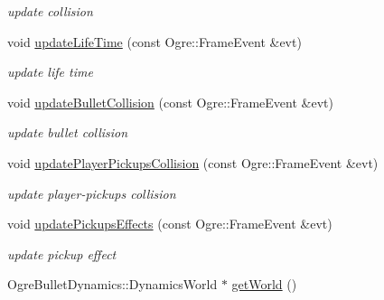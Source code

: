 \begin{DoxyCompactItemize}
\begin{DoxyCompactList}\small\item\em update collision \end{DoxyCompactList}\item 
void \hyperlink{class_n_c_t_u_1_1_obstacle_manager_a879d568c6f03ca00924e6bca87de1b4e}{update\+Life\+Time} (const Ogre\+::\+Frame\+Event \&evt)\hypertarget{class_n_c_t_u_1_1_obstacle_manager_a879d568c6f03ca00924e6bca87de1b4e}{}\label{class_n_c_t_u_1_1_obstacle_manager_a879d568c6f03ca00924e6bca87de1b4e}

\begin{DoxyCompactList}\small\item\em update life time \end{DoxyCompactList}\item 
void \hyperlink{class_n_c_t_u_1_1_obstacle_manager_a57adf5bc9c6a0fd81f02530b496b8894}{update\+Bullet\+Collision} (const Ogre\+::\+Frame\+Event \&evt)\hypertarget{class_n_c_t_u_1_1_obstacle_manager_a57adf5bc9c6a0fd81f02530b496b8894}{}\label{class_n_c_t_u_1_1_obstacle_manager_a57adf5bc9c6a0fd81f02530b496b8894}

\begin{DoxyCompactList}\small\item\em update bullet collision \end{DoxyCompactList}\item 
void \hyperlink{class_n_c_t_u_1_1_obstacle_manager_a9db096654d7779d29fc7e584a63c6a88}{update\+Player\+Pickups\+Collision} (const Ogre\+::\+Frame\+Event \&evt)\hypertarget{class_n_c_t_u_1_1_obstacle_manager_a9db096654d7779d29fc7e584a63c6a88}{}\label{class_n_c_t_u_1_1_obstacle_manager_a9db096654d7779d29fc7e584a63c6a88}

\begin{DoxyCompactList}\small\item\em update player-\/pickups collision \end{DoxyCompactList}\item 
void \hyperlink{class_n_c_t_u_1_1_obstacle_manager_ad8539bf73bdce5499fd43aacbe1aef96}{update\+Pickups\+Effects} (const Ogre\+::\+Frame\+Event \&evt)\hypertarget{class_n_c_t_u_1_1_obstacle_manager_ad8539bf73bdce5499fd43aacbe1aef96}{}\label{class_n_c_t_u_1_1_obstacle_manager_ad8539bf73bdce5499fd43aacbe1aef96}

\begin{DoxyCompactList}\small\item\em update pickup effect \end{DoxyCompactList}\item 
Ogre\+Bullet\+Dynamics\+::\+Dynamics\+World $\ast$ \hyperlink{class_n_c_t_u_1_1_obstacle_manager_aed73f2c32c6e2c728b7152162770c95a}{get\+World} ()\hypertarget{class_n_c_t_u_1_1_obstacle_manager_aed73f2c32c6e2c728b7152162770c95a}{}\label{class_n_c_t_u_1_1_obstacle_manager_aed73f2c32c6e2c728b7152162770c95a}


\end{DoxyCompactItemize}
